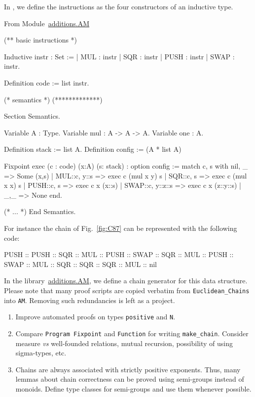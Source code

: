 In \coq{}, we define the instructions as the four constructors of an inductive type.

From Module~\href{../theories/html/hydras.additions.AM.html}{additions.AM}

\begin{Coqsrc}
(** basic instructions *)

Inductive instr : Set :=
  | MUL : instr
  | SQR : instr
  | PUSH : instr
  | SWAP : instr.       

Definition code := list instr.

(* semantics *)
(*************)

Section Semantics.

 Variable A : Type.
 Variable mul : A -> A -> A.
 Variable one : A.

 Definition stack := list A.
 Definition config := (A * list A)%

 Fixpoint exec (c : code) (x:A) (s: stack) : option config :=
   match c, s with
     nil, _ => Some (x,s)
   | MUL::c, y::s => exec c (mul x y) s
   | SQR::c, s => exec c (mul x x) s
   | PUSH::c, s => exec c x (x::s)
   | SWAP::c, y::z::s => exec c x (z::y::s)
   | _,_ => None
   end.

(* ... *)
End Semantics.
\end{Coqsrc}

For instance the chain of Fig.~\vref{fig:C87} can be represented with the following code:

\begin{Coqsrc}
  PUSH :: PUSH :: SQR  :: MUL :: PUSH :: SWAP :: SQR :: MUL :: PUSH
            :: SWAP :: MUL :: SQR :: SQR :: SQR :: MUL :: nil 
\end{Coqsrc}


In the library~\href{../theories/html/hydras.additions.AM.html}{additions.AM},
we define a chain generator for this data structure. 
Please note that many proof scripts are copied verbatim from 
\texttt{Euclidean\_Chains} into \texttt{AM}. Removing such redundancies is left as a project.



\begin{project}
 \begin{enumerate}
\item Improve automated proofs on types \texttt{positive} and \texttt{N}.
\item Compare  \texttt{Program Fixpoint} and \texttt{Function} for
writing \texttt{make\_chain}. Consider measure \emph{vs} well-founded 
relations, mutual recursion, possibility of using sigma-types, etc.
\item Chains are always associated with strictly positive exponents. 
Thus, many lemmas about chain correctness  can be proved using semi-groups instead of
monoids. Define type classes for semi-groups and use them whenever possible.
\end{enumerate}  
\end{project}


